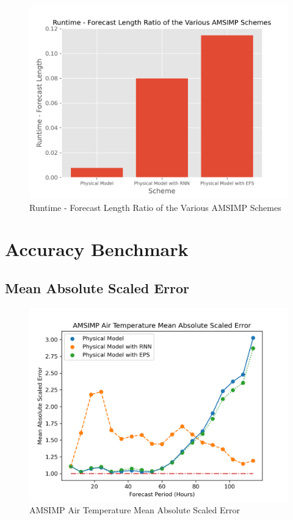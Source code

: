 \begin{figure}[H]
    \centering
    \includegraphics[width=.8\linewidth]{Graphs/performance/ratio.png}
    \caption{Runtime - Forecast Length Ratio of the Various AMSIMP Schemes}
\end{figure}

\section{Accuracy Benchmark}
\subsection{Mean Absolute Scaled Error}
\begin{figure}[H]
    \centering
    \includegraphics[width=.7\linewidth]{Graphs/accuracy/mase/temperature.png}
    \caption{AMSIMP Air Temperature Mean Absolute Scaled Error}
\end{figure}

